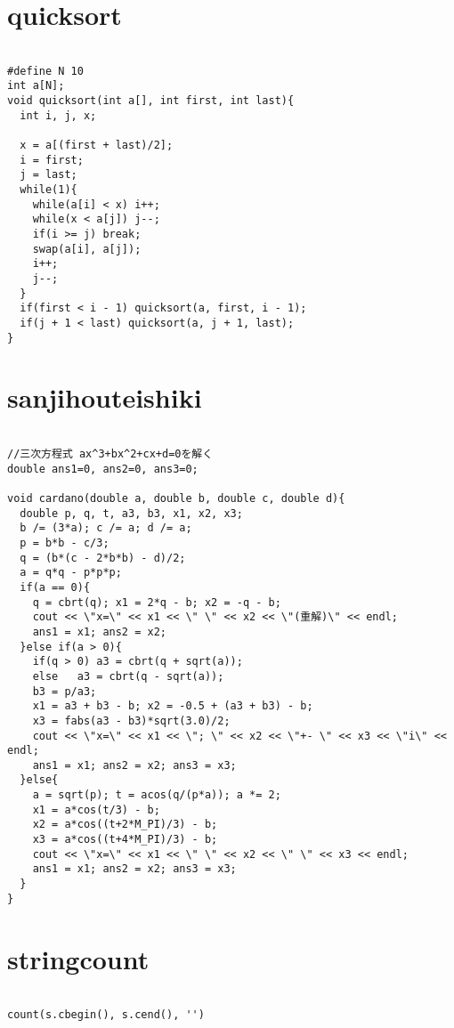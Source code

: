 \documentclass[a4j,titlepage]{jarticle} %
\begin{document}
\color{white}
\section{quicksort}
\color{black}
\begin{lstlisting}[caption=quicksort]

#define N 10
int a[N];
void quicksort(int a[], int first, int last){
  int i, j, x;

  x = a[(first + last)/2];
  i = first;
  j = last;
  while(1){
    while(a[i] < x) i++;
    while(x < a[j]) j--;
    if(i >= j) break;
    swap(a[i], a[j]);
    i++;
    j--;
  }
  if(first < i - 1) quicksort(a, first, i - 1);
  if(j + 1 < last) quicksort(a, j + 1, last);
}

\end{lstlisting}

\color{white}
\section{sanjihouteishiki}
\color{black}
\begin{lstlisting}[caption=sanjihouteishiki]

//三次方程式 ax^3+bx^2+cx+d=0を解く 
double ans1=0, ans2=0, ans3=0;

void cardano(double a, double b, double c, double d){
  double p, q, t, a3, b3, x1, x2, x3;
  b /= (3*a); c /= a; d /= a;
  p = b*b - c/3;
  q = (b*(c - 2*b*b) - d)/2;
  a = q*q - p*p*p;
  if(a == 0){
    q = cbrt(q); x1 = 2*q - b; x2 = -q - b;
    cout << \"x=\" << x1 << \" \" << x2 << \"(重解)\" << endl;
    ans1 = x1; ans2 = x2;
  }else if(a > 0){
    if(q > 0) a3 = cbrt(q + sqrt(a));
    else   a3 = cbrt(q - sqrt(a));
    b3 = p/a3;
    x1 = a3 + b3 - b; x2 = -0.5 + (a3 + b3) - b;
    x3 = fabs(a3 - b3)*sqrt(3.0)/2;
    cout << \"x=\" << x1 << \"; \" << x2 << \"+- \" << x3 << \"i\" << endl;
    ans1 = x1; ans2 = x2; ans3 = x3;
  }else{
    a = sqrt(p); t = acos(q/(p*a)); a *= 2;
    x1 = a*cos(t/3) - b;
    x2 = a*cos((t+2*M_PI)/3) - b;
    x3 = a*cos((t+4*M_PI)/3) - b;
    cout << \"x=\" << x1 << \" \" << x2 << \" \" << x3 << endl;
    ans1 = x1; ans2 = x2; ans3 = x3;
  }
}

\end{lstlisting}

\color{white}
\section{stringcount}
\color{black}
\begin{lstlisting}[caption=stringcount]

count(s.cbegin(), s.cend(), '')

\end{lstlisting}
\end{document}

